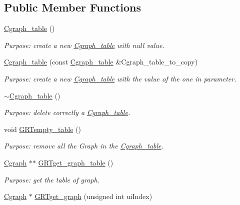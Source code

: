 \subsection*{Public Member Functions}
\begin{DoxyCompactItemize}
\item 
\hyperlink{class_cgraph__table_aabb74d501db61369797903de6329fe87}{Cgraph\+\_\+table} ()
\begin{DoxyCompactList}\small\item\em Purpose\+: create a new \hyperlink{class_cgraph__table}{Cgraph\+\_\+table} with null value. \end{DoxyCompactList}\item 
\hyperlink{class_cgraph__table_a3449715030a5e9365b35554ad75d3919}{Cgraph\+\_\+table} (const \hyperlink{class_cgraph__table}{Cgraph\+\_\+table} \&Cgraph\+\_\+table\+\_\+to\+\_\+copy)
\begin{DoxyCompactList}\small\item\em Purpose\+: create a new \hyperlink{class_cgraph__table}{Cgraph\+\_\+table} with the value of the one in parameter. \end{DoxyCompactList}\item 
\hyperlink{class_cgraph__table_a8a3d1269cabe8a29d1b6e004e1a88a1b}{$\sim$\+Cgraph\+\_\+table} ()
\begin{DoxyCompactList}\small\item\em Purpose\+: delete correctly a \hyperlink{class_cgraph__table}{Cgraph\+\_\+table}. \end{DoxyCompactList}\item 
void \hyperlink{class_cgraph__table_a6ac26aa9fbc81ea02cfec30a2062c4e3}{G\+R\+Tempty\+\_\+table} ()
\begin{DoxyCompactList}\small\item\em Purpose\+: remove all the Graph in the \hyperlink{class_cgraph__table}{Cgraph\+\_\+table}. \end{DoxyCompactList}\item 
\hyperlink{class_cgraph}{Cgraph} $\ast$$\ast$ \hyperlink{class_cgraph__table_a2a00e51699671b8fc9788729b6ee8d51}{G\+R\+Tget\+\_\+graph\+\_\+table} ()
\begin{DoxyCompactList}\small\item\em Purpose\+: get the table of graph. \end{DoxyCompactList}\item 
\hyperlink{class_cgraph}{Cgraph} $\ast$ \hyperlink{class_cgraph__table_a9ad5111e2f01f7b18b289a828007d100}{G\+R\+Tget\+\_\+graph} (unsigned int ui\+Index)
$$
\end{DoxyCompactItemize}
